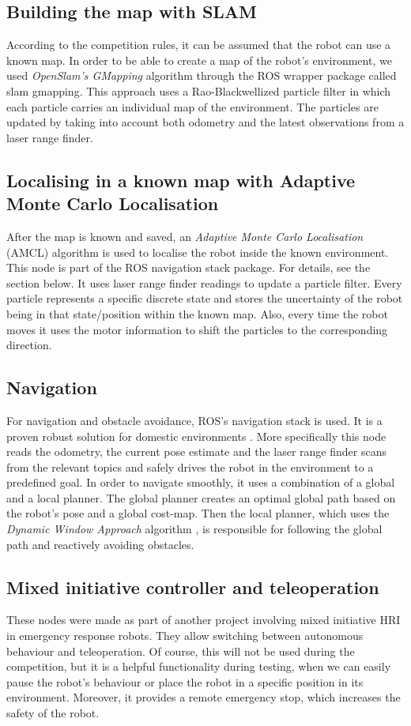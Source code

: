 \documentclass[conference]{IEEEtran}
\begin{document}
\subsection{Building the map with SLAM}
According to the competition rules, it can be assumed that the robot can use a known map. In order to be able to create a map of the robot's environment, we used \textit{OpenSlam's GMapping} algorithm \cite{slam} through the ROS wrapper package called \textsf{slam gmapping}. This approach uses a Rao-Blackwellized particle filter in which each particle carries an individual map of the environment. The particles are updated by taking into account both odometry and the latest observations from a laser range finder.

\subsection{Localising in a known map with Adaptive Monte Carlo Localisation}
After the map is known and saved, an \textit{Adaptive Monte Carlo Localisation} (AMCL)\cite{amcl} algorithm is used to localise the robot inside the known environment. This node is part of the ROS \textsf{navigation stack} package. For details, see the section below. It uses laser range finder readings to update a particle filter. Every particle represents a specific discrete state and stores the uncertainty of the robot being in that state/position within the known map. Also, every time the robot moves it uses the motor information to shift the particles to the corresponding direction.

\subsection{\label{sec:navig}Navigation}
For navigation and obstacle avoidance, ROS's \textsf{navigation stack} is used. It is a proven robust solution for domestic environments \cite{Marder-Eppstein2010}. More specifically this node reads the odometry, the current pose estimate and the laser range finder scans from the relevant topics and safely drives the robot in the environment to a predefined goal. In order to navigate smoothly, it uses a combination of a global and a local planner. The global planner creates an optimal global path based on the robot's pose and a global cost-map. Then the local planner, which uses the \textit{Dynamic Window Approach} algorithm \cite{dwa}, is responsible for following the global path and reactively avoiding obstacles.

\subsection{Mixed initiative controller and teleoperation}
These nodes were made as part of another project involving mixed initiative HRI in emergency response robots. They allow switching between autonomous behaviour and teleoperation. Of course, this will not be used during the competition, but it is a helpful functionality during testing, when we can easily pause the robot's behaviour or place the robot in a specific position in its environment. Moreover, it provides a remote emergency stop, which increases the safety of the robot.
\end{document}
